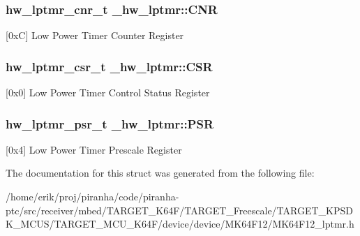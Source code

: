 \subsubsection[{\texorpdfstring{C\+NR}{CNR}}]{ {\bf hw\+\_\+lptmr\+\_\+cnr\+\_\+t} \+\_\+hw\+\_\+lptmr\+::\+C\+NR}\hypertarget{struct__hw__lptmr_a6ec4e166011a45f61b0df011f4f75823}{}\label{struct__hw__lptmr_a6ec4e166011a45f61b0df011f4f75823}
\mbox{[}0xC\mbox{]} Low Power Timer Counter Register 
\subsubsection[{\texorpdfstring{C\+SR}{CSR}}]{ {\bf hw\+\_\+lptmr\+\_\+csr\+\_\+t} \+\_\+hw\+\_\+lptmr\+::\+C\+SR}\hypertarget{struct__hw__lptmr_a49dc262582e692b9fcc2facf0b9170be}{}\label{struct__hw__lptmr_a49dc262582e692b9fcc2facf0b9170be}
\mbox{[}0x0\mbox{]} Low Power Timer Control Status Register 
\subsubsection[{\texorpdfstring{P\+SR}{PSR}}]{ {\bf hw\+\_\+lptmr\+\_\+psr\+\_\+t} \+\_\+hw\+\_\+lptmr\+::\+P\+SR}\hypertarget{struct__hw__lptmr_ae0367b5bdad58e47a433c96fcc191385}{}\label{struct__hw__lptmr_ae0367b5bdad58e47a433c96fcc191385}
\mbox{[}0x4\mbox{]} Low Power Timer Prescale Register 

The documentation for this struct was generated from the following file\+:\begin{DoxyCompactItemize}
\item 
/home/erik/proj/piranha/code/piranha-\/ptc/src/receiver/mbed/\+T\+A\+R\+G\+E\+T\+\_\+\+K64\+F/\+T\+A\+R\+G\+E\+T\+\_\+\+Freescale/\+T\+A\+R\+G\+E\+T\+\_\+\+K\+P\+S\+D\+K\+\_\+\+M\+C\+U\+S/\+T\+A\+R\+G\+E\+T\+\_\+\+M\+C\+U\+\_\+\+K64\+F/device/device/\+M\+K64\+F12/M\+K64\+F12\+\_\+lptmr.\+h\end{DoxyCompactItemize}
